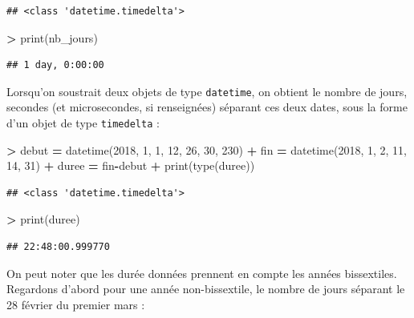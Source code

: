 \documentclass[12pt,]{book}
\newenvironment{Shaded}{\begin{snugshade}}{\end{snugshade}}
\newcommand{\DecValTok}[1]{\textcolor[rgb]{0.00,0.00,0.81}{#1}}
\newcommand{\OperatorTok}[1]{\textcolor[rgb]{0.81,0.36,0.00}{\textbf{#1}}}
\newcommand{\BuiltInTok}[1]{#1}
\newcommand{\NormalTok}[1]{#1}
\numberwithin{equation}{section}
\numberwithin{countremarque}{section}
\begin{document}
\begin{lstlisting}
## <class 'datetime.timedelta'>
\end{lstlisting}

\begin{Shaded}
\begin{Highlighting}[]
\OperatorTok{>} \BuiltInTok{print}\NormalTok{(nb_jours)}
\end{Highlighting}
\end{Shaded}

\begin{lstlisting}
## 1 day, 0:00:00
\end{lstlisting}

Lorsqu'on soustrait deux objets de type \texttt{datetime}, on obtient le
nombre de jours, secondes (et microsecondes, si renseignées) séparant
ces deux dates, sous la forme d'un objet de type \texttt{timedelta} :

\begin{Shaded}
\begin{Highlighting}[]
\OperatorTok{>}\NormalTok{ debut }\OperatorTok{=}\NormalTok{ datetime(}\DecValTok{2018}\NormalTok{, }\DecValTok{1}\NormalTok{, }\DecValTok{1}\NormalTok{, }\DecValTok{12}\NormalTok{, }\DecValTok{26}\NormalTok{, }\DecValTok{30}\NormalTok{, }\DecValTok{230}\NormalTok{)}
\OperatorTok{+}\NormalTok{ fin }\OperatorTok{=}\NormalTok{ datetime(}\DecValTok{2018}\NormalTok{, }\DecValTok{1}\NormalTok{, }\DecValTok{2}\NormalTok{, }\DecValTok{11}\NormalTok{, }\DecValTok{14}\NormalTok{, }\DecValTok{31}\NormalTok{)}
\OperatorTok{+}\NormalTok{ duree }\OperatorTok{=}\NormalTok{ fin}\OperatorTok{-}\NormalTok{debut}
\OperatorTok{+} \BuiltInTok{print}\NormalTok{(}\BuiltInTok{type}\NormalTok{(duree))}
\end{Highlighting}
\end{Shaded}

\begin{lstlisting}
## <class 'datetime.timedelta'>
\end{lstlisting}

\begin{Shaded}
\begin{Highlighting}[]
\OperatorTok{>} \BuiltInTok{print}\NormalTok{(duree)}
\end{Highlighting}
\end{Shaded}

\begin{lstlisting}
## 22:48:00.999770
\end{lstlisting}

On peut noter que les durée données prennent en compte les années
bissextiles. Regardons d'abord pour une année non-bissextile, le nombre
de jours séparant le 28 février du premier mars :
\end{document}
